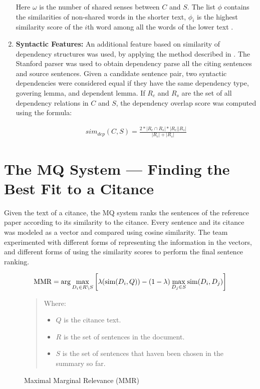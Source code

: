 \documentclass[11pt]{article}
\begin{document}
\begin{enumerate}
Here $\omega$ is the number of shared senses between $C$ and $S$. The list 
$\phi$ contains the similarities of non-shared words in the shorter text, 
$\phi_i$ is the highest similarity score of the $i$th word among all the 
words of the lower text \cite{S13-1017}. 

\item{\bf Syntactic Features:} An additional feature based on similarity of 
dependency structures was used, by applying the method described in 
\cite{S13-1017}. The Stanford parser was used to obtain dependency parse all 
the citing sentences and source sentences. Given a candidate sentence pair, 
two syntactic dependencies were considered equal if they have the same 
dependency type, govering lemma, and dependent lemma. If $R_c$ and $R_s$ are 
the set of all dependency relations in $C$ and $S$, the dependency overlap 
score was computed using the formula:

\vspace{-.3cm}
\begin{eqnarray*}
  sim_{dep}(C,S) = \frac{2*|R_c \cap R_s| * |R_c||R_s|}{|R_c|+|R_s|}
\end{eqnarray*}

\end{enumerate}

\section{The MQ System --- Finding the Best Fit to a Citance}
\label{s:mq}
Given the text of a citance, the MQ system ranks the sentences of the 
reference paper according to its similarity to the citance. Every sentence 
and its citance was modeled as a vector and compared using cosine similarity. 
The team experimented with different forms of representing the information in 
the vectors, and different forms of using the similarity scores to perform the 
final sentence ranking.

\begin{figure*}
$$
\hbox{MMR} = \arg\max_{D_i\in R\setminus S}\left[\lambda(\hbox{sim}(D_i,Q)) -
(1-\lambda) \max_{D_j\in S} \hbox{sim}(D_i,D_j)\right]
$$  
\begin{quote}
Where:
\begin{itemize}
\item $Q$ is the citance text.
\item $R$ is the set of sentences in the document.
\item $S$ is the set of sentences that haven been chosen in the
  summary so far.  
\end{itemize}
\end{quote}
  \caption{Maximal Marginal Relevance (MMR)}
  \label{fig:mmr}
\end{figure*}
\end{document}
